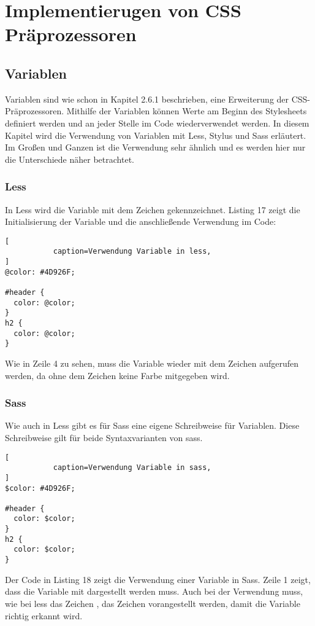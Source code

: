 \section{Implementierugen von CSS Präprozessoren}
\subsection{Variablen}
Variablen sind wie schon in Kapitel 2.6.1 beschrieben, eine Erweiterung der CSS-Präprozessoren. Mithilfe der Variablen können Werte am Beginn des Stylesheets definiert werden und an jeder Stelle im Code wiederverwendet werden. In diesem Kapitel wird die Verwendung von Variablen mit Less, Stylus und Sass erläutert. Im Großen und Ganzen ist die Verwendung sehr ähnlich und es werden hier nur die Unterschiede näher betrachtet.
\subsubsection{Less}
In Less wird die Variable mit dem Zeichen \grqq{} gekennzeichnet. Listing 17 zeigt die Initialisierung der Variable und die anschließende Verwendung im Code:
\begin{lstlisting}[
           caption=Verwendung Variable in less,
]
@color: #4D926F;

#header {
  color: @color;
}
h2 {
  color: @color;
}
\end{lstlisting}
Wie in Zeile 4 zu sehen, muss die Variable wieder mit dem \grqq{} Zeichen aufgerufen werden, da ohne dem  \glqq{} Zeichen keine Farbe mitgegeben wird.
\subsubsection{Sass}
Wie auch in Less gibt es für Sass eine eigene Schreibweise für Variablen. Diese Schreibweise gilt für beide Syntaxvarianten von sass.
\begin{lstlisting}[
           caption=Verwendung Variable in sass,
]
$color: #4D926F;

#header {
  color: $color;
}
h2 {
  color: $color;
}
\end{lstlisting}
Der Code in Listing 18 zeigt die Verwendung einer Variable in Sass. Zeile 1 zeigt, dass die Variable mit \glqq{\$}\grqq{} dargestellt werden muss. Auch bei der Verwendung muss, wie bei less das Zeichen \grqq{}, das Zeichen \glqq{\$}\grqq{} vorangestellt werden, damit die Variable richtig erkannt wird.

